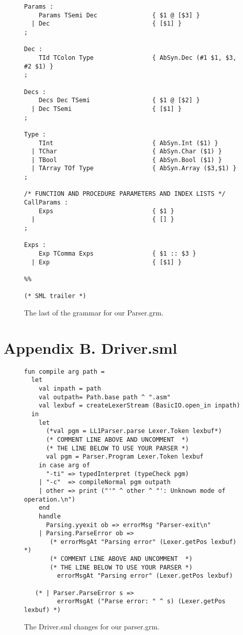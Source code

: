\documentclass[12pt,a4paper,english]{article}
\begin{document}
\begin{figure}[h]
\begin{lstlisting}
Params :
    Params TSemi Dec               { $1 @ [$3] }
  | Dec                            { [$1] }
;

Dec :
    TId TColon Type                { AbSyn.Dec (#1 $1, $3, #2 $1) }
;

Decs :
    Decs Dec TSemi                 { $1 @ [$2] }
  | Dec TSemi                      { [$1] }
;

Type :
    TInt                           { AbSyn.Int ($1) }
  | TChar                          { AbSyn.Char ($1) }
  | TBool                          { AbSyn.Bool ($1) }
  | TArray TOf Type                { AbSyn.Array ($3,$1) }
;

/* FUNCTION AND PROCEDURE PARAMETERS AND INDEX LISTS */
CallParams :
    Exps                           { $1 }
  |                                { [] }
;

Exps :
    Exp TComma Exps                { $1 :: $3 }
  | Exp                            { [$1] }

%%

(* SML trailer *)
\end{lstlisting}
\caption{The last of the grammar for our Parser.grm.}\end{figure}

\newpage
\section{Appendix B. Driver.sml}
\begin{figure}[h]
\begin{lstlisting}
fun compile arg path =
  let
    val inpath = path
    val outpath= Path.base path ^ ".asm"
    val lexbuf = createLexerStream (BasicIO.open_in inpath)
  in
    let
      (*val pgm = LL1Parser.parse Lexer.Token lexbuf*)
      (* COMMENT LINE ABOVE AND UNCOMMENT  *)
      (* THE LINE BELOW TO USE YOUR PARSER *)
      val pgm = Parser.Program Lexer.Token lexbuf
    in case arg of
      "-ti" => typedInterpret (typeCheck pgm)
    | "-c"  => compileNormal pgm outpath
    | other => print ("'" ^ other ^ "': Unknown mode of operation.\n")
    end
    handle
      Parsing.yyexit ob => errorMsg "Parser-exit\n"
    | Parsing.ParseError ob =>
       (* errorMsgAt "Parsing error" (Lexer.getPos lexbuf) *)
       (* COMMENT LINE ABOVE AND UNCOMMENT  *)
       (* THE LINE BELOW TO USE YOUR PARSER *)
         errorMsgAt "Parsing error" (Lexer.getPos lexbuf)

   (* | Parser.ParseError s =>
         errorMsgAt ("Parse error: " ^ s) (Lexer.getPos lexbuf) *)
\end{lstlisting}
\caption{The Driver.sml changes for our parser.grm.}\end{figure}
\end{document}

